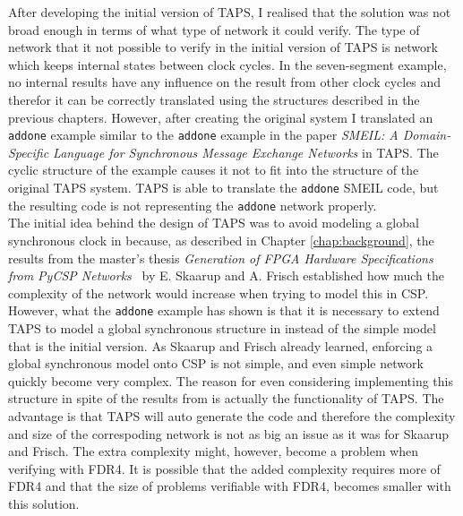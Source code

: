 After developing the initial version of TAPS, I realised that the solution was not broad enough in terms of what type of network it could verify. The type of network that it not possible to verify in the initial version of TAPS is network which keeps internal states between clock cycles. In the seven-segment example, no internal results have any influence on the result from other clock cycles and therefor it can be correctly translated using the structures described in the previous chapters.
However, after creating the original system I translated an \texttt{addone} example similar to the \texttt{addone} example in the paper \textit{SMEIL: A Domain-Specific Language for
Synchronous Message Exchange Networks}\cite{smeil} in TAPS. The cyclic structure of the example causes it not to fit into the structure of the original TAPS system. TAPS is able to translate the \texttt{addone} SMEIL code, but the resulting \cspm{} code is not representing the \texttt{addone} network properly.\\

The initial idea behind the design of TAPS was to avoid modeling a global synchronous clock in \cspm{} because, as described in Chapter \ref{chap:background}, the results from the master's thesis \textit{Generation of FPGA Hardware
Specifications from PyCSP Networks}~\cite{Skaarup14} by E. Skaarup and A. Frisch established how much the complexity of the network would increase when trying to model this in CSP.\\

However, what the \texttt{addone} example has shown is that it is necessary to extend TAPS to model a global synchronous structure in \cspm{} instead of the simple model that is the initial version. As Skaarup and Frisch already learned, enforcing a global synchronous model onto CSP is not simple, and even simple network quickly become very complex. The reason for even considering implementing this structure in spite of the results from \cite{Skaarup14} is actually the functionality of TAPS. The advantage is that TAPS will auto generate the \cspm{} code and therefore the complexity and size of the correspoding \cspm{} network is not as big an issue as it was for Skaarup and Frisch. The extra complexity might, however, become a problem when verifying with FDR4. It is possible that the added complexity requires more of FDR4 and that the size of problems verifiable with FDR4, becomes smaller with this solution. \\

